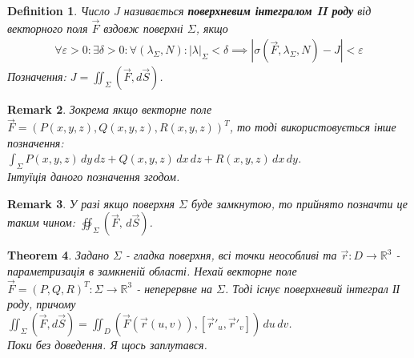 \documentclass[a4paper, 10pt]{article}
\makeatletter
\def\qed{$\blacksquare$}
\theoremstyle{theoremdd}
\newtheorem{theorem}{Theorem}[subsection]
\theoremstyle{theoremdd}
\newtheorem{definition}[theorem]{Definition}
\theoremstyle{theoremdd}
\theoremstyle{theoremdd}
\theoremstyle{theoremdd}
\theoremstyle{theoremdd}
\newtheorem{remark}[theorem]{Remark}
\theoremstyle{theoremdd}
\theoremstyle{theoremdd}
\renewenvironment{proof}[1][Proof.\\]{\par
\pushQED{\hfill \qed}%
\normalfont \topsep6\p@\@plus6\p@\relax
\trivlist
\item\relax
{\bfseries
#1\@addpunct{.}}\hspace\labelsep\ignorespaces
}{%
\popQED\endtrivlist\@endpefalse
}
\newcommand\Norm[1]{\left\lVert#1\right\rVert}
\makeatother
\begin{document}
\begin{definition}
Число $J$ називається \textbf{поверхневим інтегралом II роду} від векторного поля $\vec{F}$ вздовж поверхні $\Sigma$, якщо
\begin{align*}
\forall \varepsilon > 0: \exists \delta > 0: \forall (\lambda_\Sigma, N): |\lambda|_\Sigma < \delta \implies |\sigma(\vec{F},\lambda_\Sigma, N) - J| < \varepsilon
\end{align*}
Позначення: $J = \displaystyle\iint_\Sigma (\vec{F}, d\vec{S})$.
\end{definition}

\begin{remark}
Зокрема якщо векторне поле $\vec{F} = ( P(x,y,z), Q(x,y,z), R(x,y,z) )^T$, то тоді використовується інше позначення:\\
$\displaystyle\int_\Sigma P(x,y,z)\,dy\,dz + Q(x,y,z)\,dx\,dz + R(x,y,z)\,dx\,dy$.\\
Інтуїція даного позначення згодом.
\end{remark}

\begin{remark}
У разі якщо поверхня $\Sigma$ буде замкнутою, то прийнято позначти це таким чином: $\displaystyle\oiint_{\Sigma} (\vec{F}, \,d\vec{S})$.
\end{remark}

\begin{theorem}
Задано $\Sigma$ - гладка поверхня, всі точки неособливі та $\vec{r}: D \to \mathbb{R}^3$ - параметризація в замкненій області. Нехай векторне поле $\vec{F} = (P,Q,R)^T: \Sigma \to \mathbb{R}^3$ - неперервне на $\Sigma$. Тоді існує поверхневий інтеграл ІІ роду, причому\\
$\displaystyle\iint_\Sigma (\vec{F},d\vec{S}) = \iint_D \left(\vec{F}(\vec{r}(u,v)), [\vec{r}'_u, \vec{r}'_v]\right)\,du\,dv$.\\
\textit{Поки без доведення. Я щось заплутався.}
\end{theorem}

\end{document}
